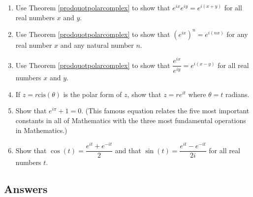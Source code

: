 \begin{enumerate}
\begin{enumerate}

\item Use Theorem \ref{prodquotpolarcomplex} to show that $e^{ix} e^{iy} = e^{i(x+y)}$ for all real numbers $x$ and $y$.

\item Use Theorem \ref{prodquotpolarcomplex} to show that $\left(e^{ix}\right)^{n} = e^{i(nx)}$ for any real number $x$ and any natural number $n$.

\item Use Theorem \ref{prodquotpolarcomplex} to show that $\dfrac{e^{ix}}{e^{iy}} = e^{i(x-y)}$ for all real numbers $x$ and $y$.

\item If $z = r\text{cis}(\theta)$ is the polar form of $z$, show that $z = re^{it}$ where $\theta = t$ radians.

\item Show that $e^{i\pi} + 1 = 0$.  (This famous equation relates the five most important constants in all of Mathematics with the three most fundamental operations in Mathematics.)

\item  \label{expformcosandsin} Show that $\cos(t) = \dfrac{e^{it} + e^{-it}}{2}$ and that $\sin(t) = \dfrac{e^{it} - e^{-it}}{2i}$ for all real numbers $t$. 

\end{enumerate}

\end{enumerate}

\newpage

\subsection{Answers}

